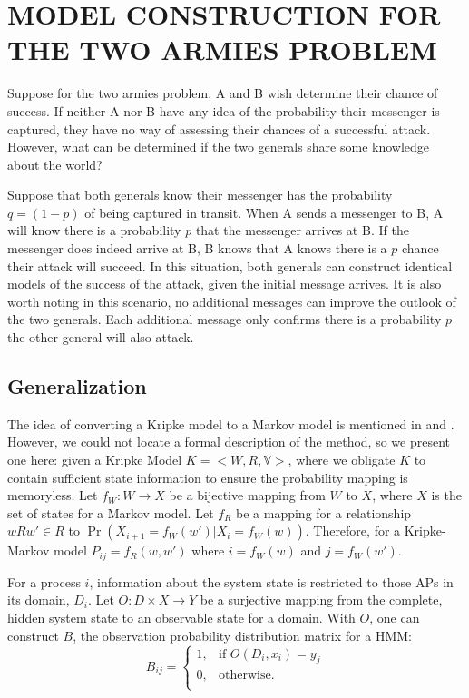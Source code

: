 \section{MODEL CONSTRUCTION FOR THE TWO ARMIES PROBLEM}
Suppose for the two armies problem, A and B wish determine their chance of success.
If neither A nor B have any idea of the probability their messenger is captured, they have no way of assessing their chances of a successful attack.
However, what can be determined if the two generals share some knowledge about the world?

Suppose that both generals know their messenger has the probability $q=(1-p)$ of being captured in transit.
When A sends a messenger to B, A will know there is a probability $p$ that the messenger arrives at B.
If the messenger does indeed arrive at B, B knows that A knows there is a $p$ chance their attack will succeed.
In this situation, both generals can construct identical models of the success of the attack, given the initial message arrives.
It is also worth noting in this scenario, no additional messages can improve the outlook of the two generals.
Each additional message only confirms there is a probability $p$ the other general will also attack.

\subsection{Generalization}

The idea of converting a Kripke model to a Markov model is mentioned in \cite{kripkemarkov1} and \cite{kripkemarkov2}.
However, we could not locate a formal description of the method, so we present one here:
given a Kripke Model $K = <W,R,\mathbb{V}>$, where we obligate $K$ to contain sufficient state information to ensure the probability mapping is memoryless.
Let $f_{W} : W \rightarrow X$ be a bijective mapping from $W$ to $X$, where $X$ is the set of states for a Markov model.
Let $f_{R}$ be a mapping for a relationship $wRw' \in R$ to $\Pr(X_{i+1}=f_W(w') | X_{i}=f_W(w))$.
Therefore, for a Kripke-Markov model $P_{ij} = f_R(w,w')$ where $i=f_W(w)$ and $j=f_W(w')$.

For a process $i$, information about the system state is restricted to those \ac{AP}s in its domain, $D_i$.
Let $O : D \times X \rightarrow Y$ be a surjective mapping from the complete, hidden system state to an observable state for a domain.
With $O$, one can construct $B$, the observation probability distribution matrix for a \ac{HMM}:
\begin{equation}
 B_{ij} =
   \begin{cases}
    1, & \text{if } O(D_i, x_i) = y_j\\
    0, & \text{otherwise.} \\
  \end{cases}
\end{equation}

